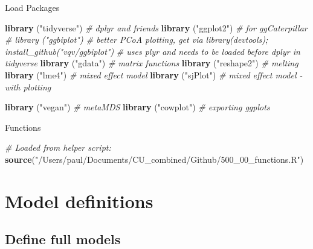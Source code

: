 \documentclass[
]{article}
\newenvironment{Shaded}{\begin{snugshade}}{\end{snugshade}}
\newcommand{\CommentTok}[1]{\textcolor[rgb]{0.56,0.35,0.01}{\textit{#1}}}
\newcommand{\KeywordTok}[1]{\textcolor[rgb]{0.13,0.29,0.53}{\textbf{#1}}}
\newcommand{\NormalTok}[1]{#1}
\newcommand{\StringTok}[1]{\textcolor[rgb]{0.31,0.60,0.02}{#1}}
\begin{document}
Load Packages

\begin{Shaded}
\begin{Highlighting}[]
\KeywordTok{library}\NormalTok{ (}\StringTok{"tidyverse"}\NormalTok{) }\CommentTok{\# dplyr and friends}
\KeywordTok{library}\NormalTok{ (}\StringTok{"ggplot2"}\NormalTok{)   }\CommentTok{\# for ggCaterpillar}
\CommentTok{\# library ("ggbiplot")  \# better PCoA plotting, get via \textasciigrave{}library(devtools); install\_github("vqv/ggbiplot")\textasciigrave{}}
                      \CommentTok{\# uses \textasciigrave{}plyr\textasciigrave{} and needs to be loaded before \textasciigrave{}dplyr\textasciigrave{} in \textasciigrave{}tidyverse\textasciigrave{} }
\KeywordTok{library}\NormalTok{ (}\StringTok{"gdata"}\NormalTok{)     }\CommentTok{\# matrix functions}
\KeywordTok{library}\NormalTok{ (}\StringTok{"reshape2"}\NormalTok{)  }\CommentTok{\# melting}
\KeywordTok{library}\NormalTok{ (}\StringTok{"lme4"}\NormalTok{)      }\CommentTok{\# mixed effect model}
\KeywordTok{library}\NormalTok{ (}\StringTok{"sjPlot"}\NormalTok{)    }\CommentTok{\# mixed effect model {-} with plotting}

\KeywordTok{library}\NormalTok{ (}\StringTok{"vegan"}\NormalTok{)     }\CommentTok{\# metaMDS}
\KeywordTok{library}\NormalTok{ (}\StringTok{"cowplot"}\NormalTok{)   }\CommentTok{\# exporting ggplots}
\end{Highlighting}
\end{Shaded}

Functions

\begin{Shaded}
\begin{Highlighting}[]
\CommentTok{\# Loaded from helper script:}
\KeywordTok{source}\NormalTok{(}\StringTok{"/Users/paul/Documents/CU\_combined/Github/500\_00\_functions.R"}\NormalTok{)}
\end{Highlighting}
\end{Shaded}

\hypertarget{model-definitions}{%
\section{Model definitions}\label{model-definitions}}

\hypertarget{define-full-models}{%
\subsection{Define full models}\label{define-full-models}}
\end{document}
